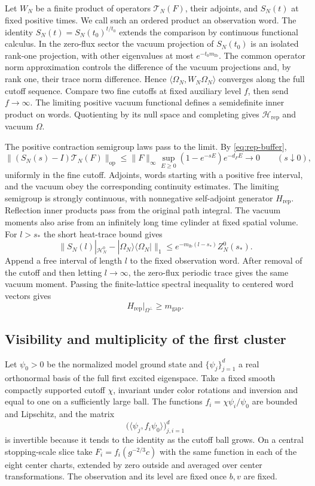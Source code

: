 \documentclass[11pt,a4paper]{article}
\numberwithin{equation}{section}
\newcommand{\op}{\mathrm{op}}
\begin{document}
Let \(W_N\) be a finite product of operators \(\mathcal T_N(F)\), their adjoints, and \(S_N(t)\) at fixed positive times. We call such an ordered product an observation word. The identity \(S_N(t)=S_N(t_0)^{t/t_0}\) extends the comparison by continuous functional calculus. In the zero-flux sector the vacuum projection of \(S_N(t_0)\) is an isolated rank-one projection, with other eigenvalues at most \(e^{-t_0m_{\mathrm{lb}}}\). The common operator norm approximation controls the difference of the vacuum projections and, by rank one, their trace norm difference. Hence \(\langle\Omega_N,W_N\Omega_N\rangle\) converges along the full cutoff sequence. Compare two fine cutoffs at fixed auxiliary level \(f\), then send \(f\to\infty\). The limiting positive vacuum functional defines a semidefinite inner product on words. Quotienting by its null space and completing gives \(\mathcal H_{\mathrm{rep}}\) and vacuum \(\Omega\).

The positive contraction semigroup laws pass to the limit. By \eqref{eq:rep-buffer},
\[
 \|(S_N(s)-I)\mathcal T_N(F)\|_{\op}
   \leq \|F\|_\infty
       \sup_{E\geq0}(1-e^{-sE})e^{-d_FE}\longrightarrow 0
          \qquad(s\downarrow0),
\]
uniformly in the fine cutoff. Adjoints, words starting with a positive free interval, and the vacuum obey the corresponding continuity estimates. The limiting semigroup is strongly continuous, with nonnegative self-adjoint generator \(H_{\mathrm{rep}}\). Reflection inner products pass from the original path integral. The vacuum moments also arise from an infinitely long time cylinder at fixed spatial volume. For \(l>s_*\) the short heat-trace bound gives
\[
 \|S_N(l)|_{\mathcal H_N^0}-|\Omega_N\rangle\langle\Omega_N|\|_1
       \leq e^{-m_{\mathrm{lb}}(l-s_*)}Z_N^0(s_*).
\]
Append a free interval of length \(l\) to the fixed observation word. After removal of the cutoff and then letting \(l\to\infty\), the zero-flux periodic trace gives the same vacuum moment. Passing the finite-lattice spectral inequality to centered word vectors gives
\begin{equation}\label{eq:rep-lower}
 H_{\mathrm{rep}}\big|_{\Omega^\perp}\geq m_{\mathrm{gap}} .
\end{equation}

\subsection{Visibility and multiplicity of the first cluster}

Let \(\psi_0>0\) be the normalized model ground state and \(\{\psi_j\}_{j=1}^d\) a real orthonormal basis of the full first excited eigenspace. Take a fixed smooth compactly supported cutoff \(\chi\), invariant under color rotations and inversion and equal to one on a sufficiently large ball. The functions \(f_i=\chi\psi_i/\psi_0\) are bounded and Lipschitz, and the matrix
\[
 \bigl(\langle\psi_j,f_i\psi_0\rangle\bigr)_{j,i=1}^d
\]
is invertible because it tends to the identity as the cutoff ball grows. On a central stopping-scale slice take \(F_i=f_i(g^{-2/3}c)\) with the same function in each of the eight center charts, extended by zero outside and averaged over center transformations. The observation and its level are fixed once \(b,v\) are fixed.
\end{document}

